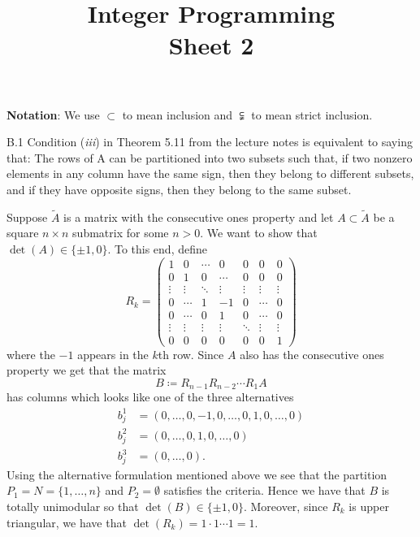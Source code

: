 \documentclass[a4paper]{article}
\title{Integer Programming \\ Sheet 2}
\begin{document}
  \maketitle
  \textbf{Notation}: We use $ \subset $ to mean inclusion and $ \subsetneqq $ to mean strict inclusion.
  \begin{exercise}{B.1}
    Condition (\textit{iii}) in Theorem 5.11 from the lecture notes is equivalent to saying that:
    The rows of A can be partitioned into two subsets such that, if two nonzero elements in
    any column have the same sign, then they belong to different subsets, and if they have
    opposite signs, then they belong to the same subset.

    Suppose $ \tilde{A} $ is a matrix with the consecutive ones property and let $ A \subset \tilde{A} $ be a square $ n \times n $ submatrix for some $ n > 0 $. We want to show that $ \det(A) \in \{\pm 1, 0\} $. To this end, define
    \begin{equation*}
    R_k = \begin{pmatrix}
      1 & 0 & \cdots & 0 & 0 & 0 &0 \\
      0 & 1 & 0 & \cdots & 0 & 0 &0 \\
      \vdots & \vdots & \ddots & \vdots & \vdots & \vdots & \vdots\\
      0 & \cdots & 1 & -1 & 0 &\cdots & 0 \\
      0 & \cdots & 0 & 1 & 0 & \cdots & 0 \\
      \vdots & \vdots & \vdots & \vdots & \ddots & \vdots & \vdots \\
      0 & 0 & 0 & 0 & 0 & 0 & 1
    \end{pmatrix}
    \end{equation*}
    where the $ -1 $ appears in the $ k $th row. Since $ A $ also has the consecutive ones property we get that the matrix
    \begin{equation*}
    B \coloneqq R_{n-1}R_{n-2}\cdots R_{1} A
    \end{equation*}
    has columns which looks like one of the three alternatives
    \begin{align*}
      b^{1}_j &= (0, \ldots, 0, -1, 0, \ldots, 0, 1, 0, \ldots, 0) \\
      b^{2}_j &= (0, \ldots, 0, 1, 0, \ldots, 0) \\
      b^{3}_j &= (0, \ldots, 0)
    .\end{align*}
    Using the alternative formulation mentioned above we see that the partition $ P_1 = N= \{1, \ldots, n\} $ and $ P_2 = \emptyset $ satisfies the criteria. Hence we have that $ B $ is totally unimodular so that $ \det(B) \in \{\pm 1, 0\} $. Moreover, since $ R_k $ is upper triangular, we have that $ \det(R_k) = 1\cdot 1 \cdots 1 = 1 $.


\end{exercise}
\end{document}
